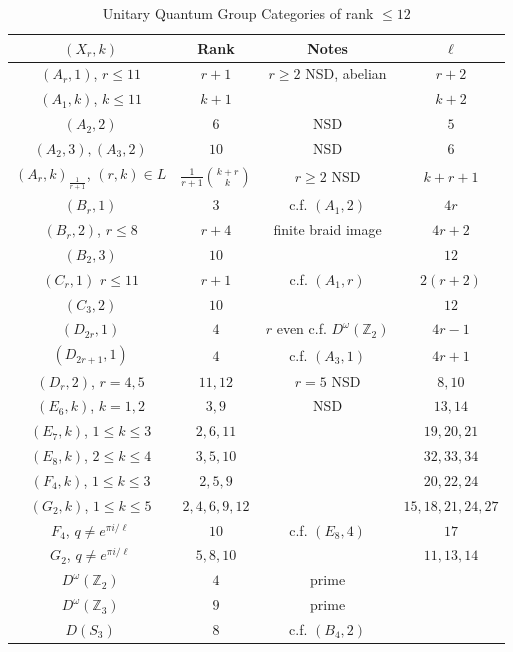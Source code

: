 \documentclass[12pt,psamsfonts]{amsart}
\newcommand{\Z}{\mathbb Z}
\numberwithin{equation}{section}
\theoremstyle{definition}
\begin{document}
\begin{table}\caption{Unitary Quantum Group Categories of rank $\le 12$}\label{rank12}
\begin{tabular}{*{4}{|c}|}
\hline
$(X_r,k)$ & Rank & Notes & $\ell$\\
\hline\hline
 $(A_r,1)$, $r\leq 11$ & $r+1$  & $r\ge 2$ NSD, abelian & $r+2$\\
\hline $(A_1,k)$, $k\leq 11$ & $k+1$ &  & $k+2$\\
\hline $(A_2,2)$ & $6$ & NSD & $5$\\
\hline $(A_2,3),(A_3,2)$ & $10$ & NSD & $6$\\
\hline $(A_r,k)_{\frac{1}{r+1}}$, $(r,k)\in L$& $\frac{1}{r+1}\binom{k+r}{k}$ & $r\ge 2$ NSD  & $k+r+1$
\\ \hline  $(B_r,1)$ & $3$ &  c.f. $(A_1,2)$ & $4r$
\\ \hline  $(B_r,2)$, $r\leq 8$ & $r+4$  & finite braid image & $4r+2$
\\ \hline  $(B_2,3)$& $10$  &  & $12$
\\ \hline  $(C_r,1)$ $r\leq 11$ & $r+1$  & c.f. $(A_1,r)$ &  $2(r+2)$
\\ \hline  $(C_3,2)$ & $10$  & & $12$
\\ \hline  $(D_{2r},1)$ & $4$ & $r$ even c.f. $D^\omega(\Z_2)$ & $4r-1$
\\ \hline  $(D_{2r+1},1)$ & $4$ &  c.f. $(A_3,1)$ & $4r+1$
\\ \hline  $(D_r,2)$, $r=4,5$& $11,12$  & $r=5$ NSD & $8,10$
\\ \hline  $(E_6,k)$, $k=1,2$ & $3,9$ & NSD & $13,14$
\\ \hline  $(E_7,k)$, $1\leq k\leq 3$& $2,6,11$& & $19,20,21$
\\ \hline  $(E_8,k)$, $2\leq k\leq 4$& $3,5,10$ & & $32,33,34$
\\ \hline  $(F_4,k)$, $1\leq k\leq 3$& $2,5,9$ & & $20,22,24$
\\ \hline  $(G_2,k)$, $1\leq k\leq 5$& $2,4,6,9,12$ & & $15,18,21,24,27$
\\ \hline $F_4$, $q\neq e^{\pi i/\ell}$& $10$ & c.f. $(E_8,4)$ & $17$
\\ \hline $G_2$, $q\neq e^{\pi i/\ell}$ & $5,8,10$ &  & $11,13,14$
\\ \hline $D^\omega(\Z_2)$ & $4$ & prime &
\\ \hline $D^\omega(\Z_3)$ & $9$ & prime &
\\ \hline $D(S_3)$ & $8$ & c.f. $(B_4,2)$ &
\\
\hline
\end{tabular}
\end{table}
\end{document}
